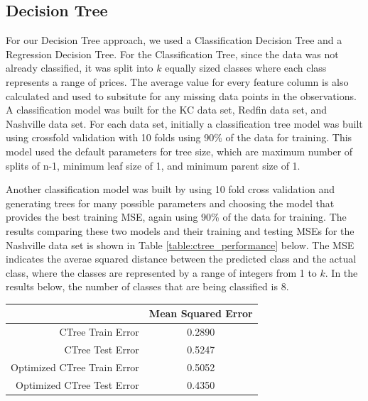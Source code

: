 \documentclass[10pt]{article}
\begin{document}
\begin{multicols}{2}
		\subsection{Decision Tree}
		\par
		For our Decision Tree approach, we used a Classification Decision Tree and a Regression Decision Tree. For the Classification Tree, since the data was not already classified, it was split into \(k\) equally sized classes where each class represents a range of prices. The average value for every feature column is also calculated and used to subsitute for any missing data points in the observations. A classification model was built for the KC data set, Redfin data set, and Nashville data set. For each data set, initially a classification tree model was built using crossfold validation with 10 folds using 90\% of the data for training. This model used the default parameters for tree size, which are maximum number of splits of n-1, minimum leaf size of 1, and minimum parent size of 1. 
		\par		
Another classification model was built by using 10 fold cross validation and generating trees for many possible parameters and choosing the model that provides the best training MSE, again using 90\% of the data for training. The results comparing these two models and their training and testing MSEs for the Nashville data set is shown in Table \ref{table:ctree_performance} below. The MSE indicates the averae squared distance between the predicted class and the actual class, where the classes are represented by a range of integers from 1 to \(k\). In the results below, the number of classes that are being classified is 8.
		\par
		\captionsetup{type=table}
			\begin{tabular}{r|c}
				& \small{Mean Squared Error} \\
				\hline
				\small{CTree Train Error} & \small{0.2890} \\
				\hline
				\small{CTree Test Error} & \small{0.5247} \\
				\hline
				\small{Optimized CTree Train Error} & \small{0.5052} \\
				\hline
				\small{Optimized CTree Test Error} & \small{0.4350} \\
				\hline
			\end{tabular}
			\label{table:ctree_performance}        
			\setlength{\parindent}{15pt}
		\par

\end{multicols}
\end{document}
